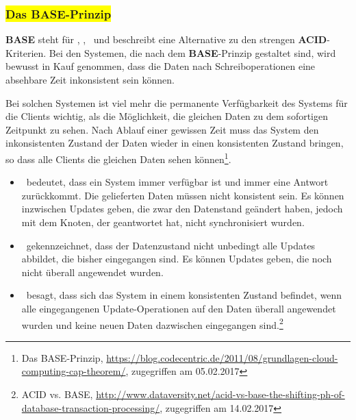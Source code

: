 %

\subsubsection{\colorbox{yellow}{Das BASE-Prinzip}}\label{base}

\textbf{BASE} steht für \BAse, \baSe, \basE\ und beschreibt eine Alternative zu den strengen \textbf{ACID}-Kriterien.
Bei den Systemen, die nach dem \textbf{BASE}-Prinzip gestaltet sind, wird bewusst in Kauf genommen, dass die Daten nach Schreiboperationen eine absehbare Zeit inkonsistent sein können.

Bei solchen Systemen ist viel mehr die permanente Verfügbarkeit des Systems für die Clients wichtig, als die Möglichkeit, die gleichen Daten zu dem sofortigen Zeitpunkt zu sehen. Nach Ablauf einer gewissen Zeit muss das System den inkonsistenten Zustand der Daten wieder in einen konsistenten Zustand bringen, so dass alle Clients die gleichen Daten sehen können\footnote{Das BASE-Prinzip, \url{https://blog.codecentric.de/2011/08/grundlagen-cloud-computing-cap-theorem/}, zugegriffen am 05.02.2017}.

\begin{itemize}
\item \BAse\ bedeutet, dass ein System immer verfügbar ist und immer eine Antwort zurückkommt. Die gelieferten Daten müssen nicht konsistent sein. Es können inzwischen Updates geben, die zwar den Datenstand geändert haben, jedoch mit dem Knoten, der geantwortet hat, nicht synchronisiert wurden.

\item \baSe\ gekennzeichnet, dass der Datenzustand nicht unbedingt alle Updates abbildet, die bisher eingegangen sind. Es können Updates geben, die noch nicht überall angewendet wurden.

\item \basE\ besagt, dass sich das System in einem konsistenten Zustand befindet, wenn alle eingegangenen Update-Operationen auf den Daten überall angewendet wurden und keine neuen Daten dazwischen eingegangen sind.\footnote{ACID vs. BASE, \url{http://www.dataversity.net/acid-vs-base-the-shifting-ph-of-database-transaction-processing/}, zugegriffen am 14.02.2017}
\end{itemize}

